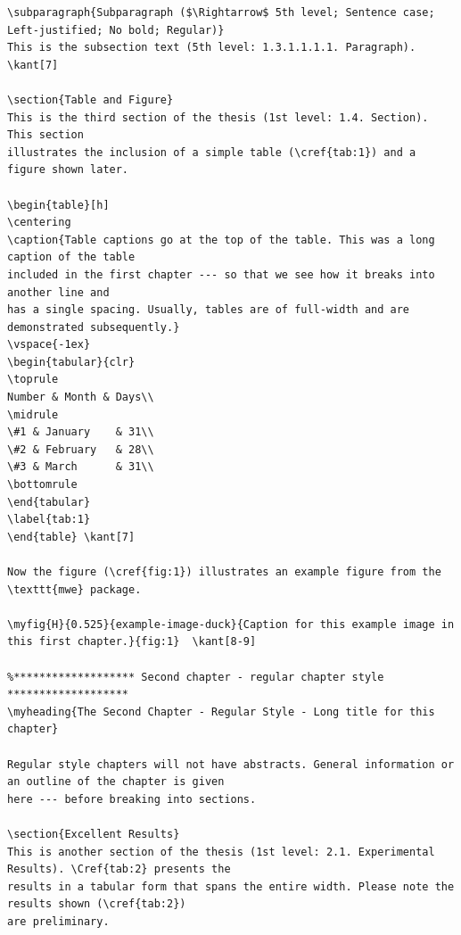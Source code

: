 \documentclass{article}
\begin{document}
{\begin{verbatim}
\subparagraph{Subparagraph ($\Rightarrow$ 5th level; Sentence case; Left-justified; No bold; Regular)}
This is the subsection text (5th level: 1.3.1.1.1.1. Paragraph). \kant[7]

\section{Table and Figure}
This is the third section of the thesis (1st level: 1.4. Section). This section
illustrates the inclusion of a simple table (\cref{tab:1}) and a figure shown later.

\begin{table}[h]
\centering
\caption{Table captions go at the top of the table. This was a long caption of the table
included in the first chapter --- so that we see how it breaks into another line and
has a single spacing. Usually, tables are of full-width and are demonstrated subsequently.}
\vspace{-1ex}
\begin{tabular}{clr}
\toprule
Number & Month & Days\\
\midrule
\#1 & January    & 31\\
\#2 & February   & 28\\
\#3 & March      & 31\\
\bottomrule
\end{tabular}
\label{tab:1}
\end{table}	\kant[7]

Now the figure (\cref{fig:1}) illustrates an example figure from the \texttt{mwe} package.

\myfig{H}{0.525}{example-image-duck}{Caption for this example image in this first chapter.}{fig:1} 	\kant[8-9]

%******************* Second chapter - regular chapter style *******************
\myheading{The Second Chapter - Regular Style - Long title for this chapter}

Regular style chapters will not have abstracts. General information or an outline of the chapter is given
here --- before breaking into sections.

\section{Excellent Results}
This is another section of the thesis (1st level: 2.1. Experimental Results). \Cref{tab:2} presents the
results in a tabular form that spans the entire width. Please note the results shown (\cref{tab:2}) 
are preliminary.


\end{verbatim}}
\end{document}
